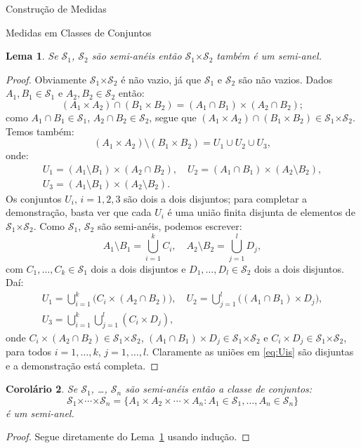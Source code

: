 \documentclass[oneside,final,11pt]{amsbook}
\newcommand{\Times}{\pmb{\times}}
\theoremstyle{remark}\newtheorem{exercise}{Exercício}[chapter]
\theoremstyle{remark}\newtheorem{*exercise}[exercise]{\hbox to 0pt{\hskip 0pt minus 1fil*}Exercício}
\theoremstyle{definition}\newtheorem{exdefin}{Definição}[chapter]
\theoremstyle{plain}\newtheorem{teo}{Teorema}[section]
\theoremstyle{plain}\newtheorem{lem}[teo]{Lema}
\theoremstyle{plain}\newtheorem{prop}[teo]{Proposição}
\theoremstyle{plain}\newtheorem{cor}[teo]{Corolário}
\theoremstyle{definition}\newtheorem{defin}[teo]{Definição}
\theoremstyle{remark}\newtheorem{rem}[teo]{Observação}
\theoremstyle{definition}\newtheorem{notation}[teo]{Notação}
\theoremstyle{definition}\newtheorem{convention}[teo]{Convenção}
\theoremstyle{definition}\newtheorem{example}[teo]{Exemplo}
\numberwithin{section}{chapter}
\numberwithin{equation}{section}
\begin{document}
\begin{chapter}{Construção de Medidas}
\begin{section}{Medidas em Classes de Conjuntos}
\begin{lem}\label{thm:prodsemianel}
Se $\mathcal S_1$, $\mathcal S_2$ são semi-anéis então $\mathcal S_1\Times\mathcal S_2$
também é um semi-anel.
\end{lem}
\begin{proof}
Obviamente $\mathcal S_1\Times\mathcal S_2$ é não vazio, já que $\mathcal S_1$ e
$\mathcal S_2$ são não vazios. Dados
$A_1,B_1\in\mathcal S_1$ e $A_2,B_2\in\mathcal S_2$ então:
\[(A_1\times A_2)\cap(B_1\times B_2)=(A_1\cap B_1)\times(A_2\cap B_2);\]
como $A_1\cap B_1\in\mathcal S_1$, $A_2\cap B_2\in\mathcal S_2$, segue que
$(A_1\times A_2)\cap(B_1\times B_2)\in\mathcal S_1\Times\mathcal S_2$. Temos também:
\[(A_1\times A_2)\setminus(B_1\times B_2)=U_1\cup U_2\cup U_3,\]
onde:
\begin{gather*}
U_1=(A_1\setminus B_1)\times(A_2\cap B_2),\quad U_2=(A_1\cap B_1)\times(A_2\setminus B_2),\\
U_3=(A_1\setminus B_1)\times(A_2\setminus B_2).
\end{gather*}
Os conjuntos $U_i$, $i=1,2,3$ são dois a dois disjuntos; para completar a demonstração, basta ver que cada
$U_i$ é uma união finita disjunta de elementos de $\mathcal S_1\Times\mathcal S_2$. Como $\mathcal S_1$, $\mathcal S_2$ são semi-anéis, podemos
escrever:
\[A_1\setminus B_1=\bigcup_{i=1}^kC_i,\quad A_2\setminus B_2=\bigcup_{j=1}^lD_j,\]
com $C_1,\ldots,C_k\in\mathcal S_1$ dois a dois disjuntos e $D_1,\ldots,D_l\in\mathcal S_2$ dois a dois disjuntos.
Daí:
\begin{equation}\label{eq:Uis}
\begin{gathered}
U_1=\bigcup_{i=1}^k\big(C_i\times(A_2\cap B_2)\big),\quad
U_2=\bigcup_{j=1}^l\big((A_1\cap B_1)\times D_j\big),\\
U_3=\bigcup_{i=1}^k\bigcup_{j=1}^l(C_i\times D_j),
\end{gathered}
\end{equation}
onde $C_i\times(A_2\cap B_2)\in\mathcal S_1\Times\mathcal S_2$, $(A_1\cap B_1)\times D_j\in\mathcal S_1\Times\mathcal S_2$
e $C_i\times D_j\in\mathcal S_1\Times\mathcal S_2$, para todos $i=1,\ldots,k$, $j=1,\ldots,l$. Claramente as uniões em \eqref{eq:Uis}
são disjuntas e a demonstração está completa.
\end{proof}

\begin{cor}
Se $\mathcal S_1$, \dots, $\mathcal S_n$ são semi-anéis então a classe de conjuntos:
\[\mathcal S_1\Times\cdots\Times\mathcal S_n=\big\{A_1\times A_2\times\cdots\times A_n:A_1\in\mathcal S_1,\ldots,A_n\in\mathcal S_n\big\}\]
é um semi-anel.
\end{cor}
\begin{proof}
Segue diretamente do Lema~\ref{thm:prodsemianel} usando indução.
\end{proof}


\end{section}
\end{chapter}
\end{document}
